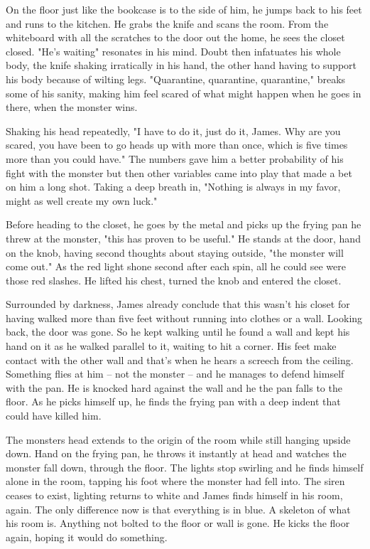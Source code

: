         On the floor just like the bookcase is to the side of him, he jumps back to his feet and runs to the kitchen. He grabs the knife and
    scans the room. From the whiteboard with all the scratches to the door out the home, he sees the closet closed. "He's waiting" resonates
    in his mind. Doubt then infatuates his whole body, the knife shaking irratically in his hand, the other hand having to support his body
    because of wilting legs. "Quarantine, quarantine, quarantine," breaks some of his sanity, making him feel scared of what might happen
    when he goes in there, when the monster wins.

        Shaking his head repeatedly, "I have to do it, just do it, James. Why are you scared, you have been to go heads up with more than once,
    which is five times more than you could have." The numbers gave him a better probability of his fight with the monster but then other
    variables came into play that made a bet on him a long shot. Taking a deep breath in, "Nothing is always in my favor, might as well create
    my own luck."

        Before heading to the closet, he goes by the metal and picks up the frying pan he threw at the monster, "this has proven to be useful."
    He stands at the door, hand on the knob, having second thoughts about staying outside, "the monster will come out." As the red light shone
    second after each spin, all he could see were those red slashes. He lifted his chest, turned the knob and entered the closet.

        Surrounded by darkness, James already conclude that this wasn't his closet for having walked more than five feet without running into
    clothes or a wall. Looking back, the door was gone. So he kept walking until he found a wall and kept his hand on it as he walked parallel
    to it, waiting to hit a corner. His feet make contact with the other wall and that's when he hears a screech from the ceiling. Something
    flies at him -- not the monster -- and he manages to defend himself with the pan. He is knocked hard against the wall and he the pan falls
    to the floor. As he picks himself up, he finds the frying pan with a deep indent that could have killed him.

        The monsters head extends to the origin of the room while still hanging upside down. Hand on the frying pan, he throws it instantly at
    head and watches the monster fall down, through the floor. The lights stop swirling and he finds himself alone in the room, tapping his foot
    where the monster had fell into. The siren ceases to exist, lighting returns to white and James finds himself in his room, again. The only
    difference now is that everything is in blue. A skeleton of what his room is. Anything not bolted to the floor or wall is gone. He kicks
    the floor again, hoping it would do something.

